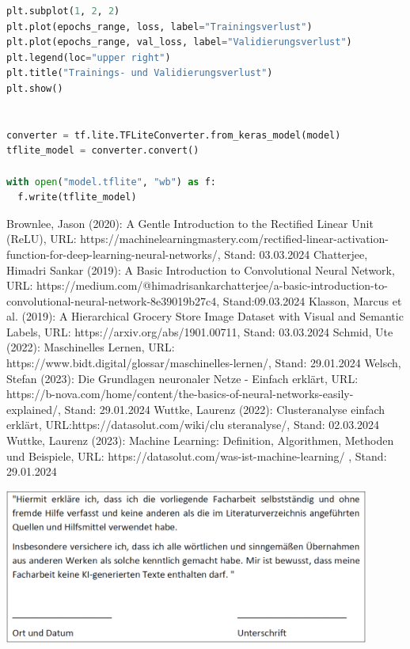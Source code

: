 \documentclass[11pt,oneside]{report}
\begin{document}
\begin{lstlisting}[language=Python]
plt.subplot(1, 2, 2)
plt.plot(epochs_range, loss, label="Trainingsverlust")
plt.plot(epochs_range, val_loss, label="Validierungsverlust")
plt.legend(loc="upper right")
plt.title("Trainings- und Validierungsverlust")
plt.show()


converter = tf.lite.TFLiteConverter.from_keras_model(model)
tflite_model = converter.convert()

with open("model.tflite", "wb") as f:
  f.write(tflite_model)

\end{lstlisting}



\begin{thebibliography}{}
	\bibitem{}Brownlee, Jason (2020): A Gentle Introduction to the Rectified Linear Unit (ReLU), URL: https://machinelearningmastery.com/rectified-linear-activation-function-for-deep-learning-neural-networks/, Stand: 03.03.2024
	\bibitem{}Chatterjee, Himadri Sankar (2019): A Basic Introduction to Convolutional Neural Network, URL: https://medium.com/@himadrisankarchatterjee/a-basic-introduction-to-convolutional-neural-network-8e39019b27c4, Stand:09.03.2024
	\bibitem{}Klasson, Marcus et al. (2019): A Hierarchical Grocery Store Image Dataset with Visual and Semantic Labels, URL: https://arxiv.org/abs/1901.00711, Stand: 03.03.2024
	\bibitem{}Schmid, Ute (2022): Maschinelles Lernen, URL: https://www.bidt.digital/glossar/maschinelles-lernen/, Stand: 29.01.2024
	\bibitem{}Welsch, Stefan (2023): Die Grundlagen neuronaler Netze - Einfach erklärt, URL: https://b-nova.com/home/content/the-basics-of-neural-networks-easily-explained/, Stand: 29.01.2024
	\bibitem{}Wuttke, Laurenz (2022): Clusteranalyse einfach erklärt, URL:https://datasolut.com/wiki/clu steranalyse/, Stand: 02.03.2024
	\bibitem{}Wuttke, Laurenz (2023): Machine Learning: Definition, Algorithmen, Methoden und Beispiele, URL: https://datasolut.com/was-ist-machine-learning/ , Stand: 29.01.2024
\end{thebibliography}


\newpage

\includegraphics[width=0.9\textwidth]{selbststaendigkeitserklaerung}
\end{document}
